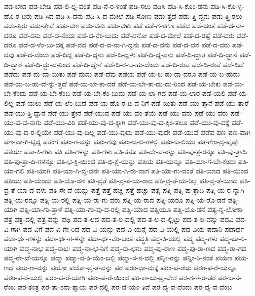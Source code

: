 {ಪಡ-ಬೇಡ
ಪಡ-ಬೇಡಿ
ಪಡ-ಲಿ-ಲ್ಲ-ವಂತೆ
ಪಡಿ-ನೆ-ರ-ಳಂತೆ
ಪಡಿ-ಸಲು
ಪಡಿಸಿ
ಪಡಿ-ಸಿ-ಕೊಂ-ಡನು
ಪಡಿ-ಸಿ-ಕೊ-ಳ್ಳ-ಹೊ-ರ-ಟರು
ಪಡಿ-ಸಿದ
ಪಡಿ-ಸಿ-ದನು
ಪಡಿ-ಸಿ-ದ-ಮೇಲೆ
ಪಡಿ-ಸೋಣ
ಪಡು-ತ್ತದೆ
ಪಡು-ತ್ತಿ-ದ್ದನು
ಪಡು-ತ್ತಿ-ರಲು
ಪಡು-ತ್ತಿರು
ಪಡು-ತ್ತೇವೆ
ಪಡು-ವಣ
ಪಡು-ವನು
ಪಡು-ವಳು
ಪಡೆ
ಪಡೆ-ಗ-ಳಿಗೂ
ಪಡೆದ
ಪಡೆ-ದಂತೆ
ಪಡೆ-ದ-ನಾ-ದರೂ
ಪಡೆ-ದನು
ಪಡೆ-ದ-ನೆಂದು
ಪಡೆ-ದ-ನೆಂ-ಬುದು
ಪಡೆ-ದನೋ
ಪಡೆ-ದ-ಮೇಲೆ
ಪಡೆ-ದ-ರಷ್ಟೆ
ಪಡೆ-ದರು
ಪಡೆ-ದರೂ
ಪಡೆ-ದ-ಳೆಂ-ಬು-ದಕ್ಕೆ
ಪಡೆ-ದವ
ಪಡೆ-ದ-ವ-ನಾ-ಗಿ-ದ್ದನು
ಪಡೆ-ದ-ವನು
ಪಡೆ-ದ-ವನೆ
ಪಡೆ-ದ-ವರು
ಪಡೆ-ದವು
ಪಡೆ-ದ-ವೆಂದು
ಪಡೆ-ದಿದ್ದ
ಪಡೆ-ದಿ-ದ್ದನು
ಪಡೆ-ದಿ-ದ್ದಳು
ಪಡೆ-ದಿ-ದ್ದ-ವನು
ಪಡೆ-ದಿ-ದ್ದಾತ
ಪಡೆ-ದಿ-ದ್ದಾನೆ
ಪಡೆ-ದಿ-ದ್ದಾರೆ
ಪಡೆ-ದಿ-ದ್ದು-ದ-ರಿಂದ
ಪಡೆ-ದಿ-ದ್ದೇನೆ
ಪಡೆ-ದಿ-ರ-ಬ-ಹು-ದೆಂದು
ಪಡೆ-ದಿ-ರುವ
ಪಡೆ-ದಿ-ರುವೆ
ಪಡೆ-ದಿವೆ
ಪಡೆದು
ಪಡೆ-ದು-ದಾ-ಯಿತು
ಪಡೆ-ದುದು
ಪಡೆ-ದೆವು
ಪಡೆಯ
ಪಡೆ-ಯ-ಬ-ಹು-ದಾ-ದರೂ
ಪಡೆ-ಯ-ಬ-ಹುದು
ಪಡೆ-ಯ-ಬ-ಹು-ದೆ-ನ್ನು-ತ್ತದೆ
ಪಡೆ-ಯ-ಬೇ-ಕಾ-ದರೆ
ಪಡೆ-ಯ-ಬೇ-ಕಾ-ದು-ದು-ರಿಂದ
ಪಡೆ-ಯ-ಬೇಕು
ಪಡೆ-ಯ-ಬೇ-ಕೆಂದು
ಪಡೆ-ಯ-ಬೇ-ಕೆಂಬ
ಪಡೆ-ಯ-ಬೇ-ಕೆಂ-ಬುದು
ಪಡೆ-ಯ-ಲಾ-ಗದ
ಪಡೆ-ಯ-ಲಾರ
ಪಡೆ-ಯಲಿ
ಪಡೆ-ಯ-ಲಿಲ್ಲ
ಪಡೆ-ಯಲು
ಪಡೆ-ಯ-ಲೆಂ-ಬುದೆ
ಪಡೆ-ಯ-ಹೊ-ರ-ಟ-ವ-ನಿಗೆ
ಪಡೆ-ಯಿತು
ಪಡೆ-ಯು-ತ್ತಾನೆ
ಪಡೆ-ಯು-ತ್ತಾರೆ
ಪಡೆ-ಯು-ತ್ತಿ-ದ್ದಾನೆ
ಪಡೆ-ಯು-ತ್ತೇನೆ
ಪಡೆ-ಯುವ
ಪಡೆ-ಯು-ವಂ-ತೆಯೆ
ಪಡೆ-ಯು-ವನು
ಪಡೆ-ಯು-ವರು
ಪಡೆ-ಯು-ವ-ವ-ನಾಗು
ಪಡೆ-ಯು-ವಿರಿ
ಪಡೆ-ಯು-ವು-ದ-ಕ್ಕಾಗಿ
ಪಡೆ-ಯು-ವು-ದ-ಕ್ಕಿಂ-ತಲೂ
ಪಡೆ-ಯು-ವು-ದಕ್ಕೆ
ಪಡೆ-ಯು-ವು-ದ-ರ-ಲ್ಲಿಯೇ
ಪಡೆ-ಯು-ವು-ದಿಲ್ಲ
ಪಡೆ-ಯು-ವುದು
ಪಡೆ-ಯು-ವುದೇ
ಪಡೆ-ಯುವೆ
ಪಡೆವ
ಪಣ
ಪಣ-ವಾಗಿ
ಪಣ-ವಾ-ಗಿ-ಟ್ಟಿದ್ದ
ಪತಂಗ
ಪತಂ-ಗ-ವನ್ನು
ಪತಂ-ಗವು
ಪತಂ-ಜ-ಲಿ-ಗಳಲ್ಲಿ
ಪತಂ-ಜ-ಲಿಯು
ಪತ-ಗೇಂ-ದ್ರ-ಪೃಷ್ಠೇ
ಪತಯೇ
ಪತಾ-ಕಿ-ಗಳು
ಪತಿ
ಪತಿ-ಗಳನ್ನು
ಪತಿ-ಗಳು
ಪತಿ-ತನೂ
ಪತಿ-ದೇ-ವ-ರನ್ನು
ಪತಿ-ಪು-ತ್ರ-ರನ್ನೂ
ಪತಿ-ಪು-ತ್ರಾದಿ
ಪತಿ-ಪು-ತ್ರಾ-ದಿ-ಗಳನ್ನೂ
ಪತಿ-ಭ-ಕ್ತಿ-ಯಿಂದ
ಪತಿ-ಭಿ-ಕ್ಷೆ-ಯನ್ನು
ಪತಿಯ
ಪತಿ-ಯನ್ನೂ
ಪತಿ-ಯಾ-ಗ-ಬೇ-ಕೆಂದು
ಪತಿ-ಯಾ-ಗಲಿ
ಪತಿ-ಯಾಗಿ
ಪತಿ-ಯಾ-ಗಿ-ದ್ದ-ವನೇ
ಪತಿ-ಯಾ-ಗಿ-ರು-ವಾಗ
ಪತಿ-ಯಾ-ಗು-ವಂತೆ
ಪತಿ-ಯಾದ
ಪತಿ-ಯಿಂದ
ಪತಿಯು
ಪತಿ-ಯೆಂದು
ಪತಿ-ಯೊ-ಡನೆ
ಪತಿ-ವ್ರತೆ
ಪತಿ-ವ್ರ-ತೆ-ಯ-ರಾದ
ಪತಿ-ವ್ರ-ತೆ-ಯ-ರಿಲ್ಲ
ಪತಿ-ವ್ರ-ತೆ-ಯಾದ
ಪತಿ-ವ್ರ-ತೆ-ಯಾ-ದ-ವಳು
ಪತಿ-ಸೇ-ವೆ-ಯನ್ನು
ಪತ್ತೆ
ಪತ್ತೆ-ಹಚ್ಚಿ
ಪತ್ತೆ-ಹಚ್ಚು
ಪತ್ನ
ಪತ್ನಿ
ಪತ್ನಿ-ಪು-ತ್ರಾದಿ
ಪತ್ನಿ-ಯ-ರ-ನ್ನಾಗಿ
ಪತ್ನಿ-ಯ-ರನ್ನೂ
ಪತ್ನಿ-ಯ-ರಲ್ಲಿ
ಪತ್ನಿ-ಯ-ರಾ-ಗು-ವರು
ಪತ್ನಿ-ಯ-ರಾದ
ಪತ್ನಿ-ಯರೂ
ಪತ್ನಿ-ಯ-ರೊ-ಡನೆ
ಪತ್ನಿ-ಯಾಗಿ
ಪತ್ನಿ-ಯಾ-ಗು-ತ್ತಾಳೆ
ಪತ್ನಿ-ಯಾ-ಗು-ವು-ದ-ರಲ್ಲಿ
ಪತ್ನಿ-ಯಾದ
ಪತ್ನಿಯೂ
ಪತ್ನಿ-ಯೊ-ಡನೆ
ಪತ್ಯ-ನ್ನ-ಲೋಕಾ
ಪತ್ರ
ಪತ್ರ-ದಲ್ಲಿ
ಪತ್ರ-ವನ್ನು
ಪಥಿ
ಪದ-ತ-ಲದ
ಪದ-ತ-ಲ-ದಲ್ಲಿ
ಪದ-ತ-ಲ-ದ-ಲ್ಲಿಟ್ಟು
ಪದ-ತ-ಲ-ವನ್ನು
ಪದವಿ
ಪದ-ವಿ-ಗಾಗಿ
ಪದ-ವಿಗೆ
ಪದ-ವಿ-ಗೇ-ರಿದ
ಪದ-ವಿ-ಯನ್ನು
ಪದ-ವಿ-ಯನ್ನೆ
ಪದ-ವಿ-ಯಲ್ಲಿ
ಪದ-ವಿಯೆ
ಪದಾನಿ
ಪದಾರ್ಥ
ಪದಾ-ರ್ಥ-ಗಳನ್ನು
ಪದಾ-ರ್ಥ-ಗ-ಳನ್ನೇ
ಪದಾ-ರ್ಥ-ವೆಂ-ಬಂತೆ
ಪದ್ಧತಿ
ಪದ್ಧ-ತಿ-ಯಲ್ಲಿ
ಪದ್ಮ
ಪದ್ಮ-ಗಳು
ಪದ್ಮ-ಧಾ-ರಿ-ಯಾಗಿ
ಪದ್ಮ-ನಾಭ
ಪದ್ಮ-ನಾಭಃ
ಪದ್ಮ-ನಾ-ಭ-ನಿಗೆ
ಪದ್ಮ-ನಾ-ಭನು
ಪದ್ಮ-ಪು-ರಾಣ
ಪದ್ಮ-ಪು-ರಾ-ಣದ
ಪದ್ಮ-ರಾ-ಗದ
ಪದ್ಮ-ರೇ-ಖೆ-ಯನ್ನೂ
ಪದ್ಮಾ
ಪದ್ಮಾ-ವ-ತಿ-ಯೆಂ-ಬಲ್ಲಿ
ಪದ್ಮಾ-ಸ-ನ-ದಲ್ಲಿ
ಪನ್ನೀ-ರನ್ನು
ಪನ್ನೀ-ರಿ-ನಂತೆ
ಪಯಣ
ಪಯ-ಣದ
ಪಯ-ಣ-ವನ್ನು
ಪಯೋ
ಪಯೋ-ವ್ರ-ತ-ವನ್ನು
ಪರ
ಪರಂ-ಧಾ-ಮಕ್ಕೆ
ಪರಂ-ಪ-ರೆಯ
ಪರಂ-ಪ-ರೆ-ಯನ್ನೂ
ಪರಂ-ಪ-ರೆ-ಯಲ್ಲಿ
ಪರಂ-ಪ-ರೆ-ಯಾಗಿ
ಪರಂ-ಪ-ರೆ-ಯಿಂದ
ಪರ-ಕಾ-ಯ-ಪ್ರ-ವೇಶ
ಪರ-ಗ-ಳೆ-ರ-ಡರ
ಪರ-ಜ-ನ-ರೆಂಬ
ಪರ-ತಂತ್ರ
ಪರ-ತಾ-ಽನಾ-ತ್ಮಾಯ
ಪರ-ದಲ್ಲಿ
ಪರ-ದೆ-ಯಂ-ತಿವೆ
ಪರ-ದೈ-ವ-ವೆಂದು
ಪರ-ದೈ-ವ-ವೆಂಬ
}
